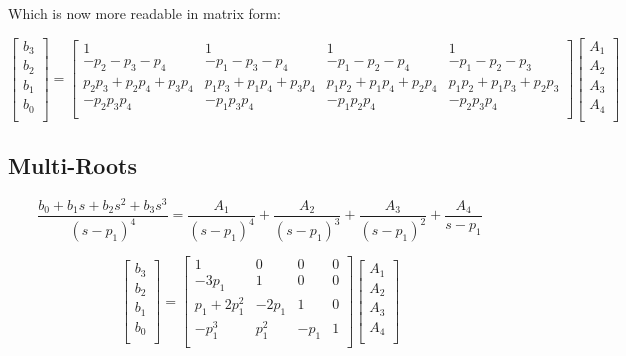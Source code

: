 Which is now more readable in matrix form:

\begin{equation}
    \begin{bmatrix}
        b_3 \\
        b_2 \\
        b_1 \\
        b_0 \\
    \end{bmatrix} =
    \begin{bmatrix}
        1                    & 1                    & 1                    & 1 \\
        -p_2-p_3-p_4         & -p_1-p_3-p_4         & -p_1-p_2-p_4         & -p_1-p_2-p_3 \\
        p_2p_3+p_2p_4+p_3p_4 & p_1p_3+p_1p_4+p_3p_4 & p_1p_2+p_1p_4+p_2p_4 & p_1p_2+p_1p_3+p_2p_3 \\
        -p_2p_3p_4           & -p_1p_3p_4           & -p_1p_2p_4           & -p_2p_3p_4 \\
    \end{bmatrix}
    \begin{bmatrix}
        A_1 \\
        A_2 \\
        A_3 \\
        A_4 \\
    \end{bmatrix}
\end{equation}


\subsection{Multi-Roots}

\begin{equation}
    \frac{b_0 + b_1s + b_2s^2 + b_3s^3}{(s-p_1)^4} = \frac{A_1}{(s-p_1)^4} + \frac{A_2}{(s-p_1)^3} + \frac{A_3}{(s-p_1)^2} + \frac{A_4}{s-p_1}
\end{equation}

\begin{equation}
    \begin{bmatrix}
        b_3 \\
        b_2 \\
        b_1 \\
        b_0 \\
    \end{bmatrix} =
    \begin{bmatrix}
        1            & 0     & 0    & 0 \\
        -3p_1        & 1     & 0    & 0 \\
        p_1 + 2p_1^2 & -2p_1 & 1    & 0 \\
        -p_1^3       & p_1^2 & -p_1 & 1 \\
    \end{bmatrix}
    \begin{bmatrix}
        A_1 \\
        A_2 \\
        A_3 \\
        A_4 \\
    \end{bmatrix}
\end{equation}

